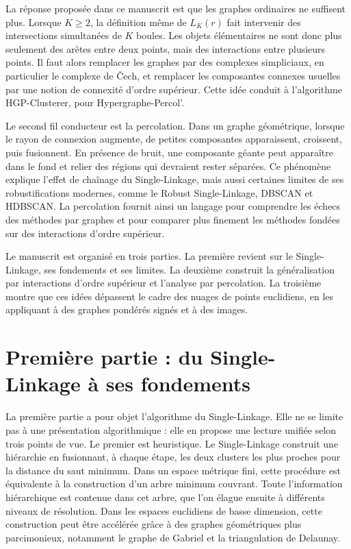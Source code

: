 La réponse proposée dans ce manuscrit est que les graphes ordinaires ne suffisent plus. Lorsque $K\geq 2$, la définition même de $L_K(r)$ fait intervenir des intersections simultanées de $K$ boules. Les objets élémentaires ne sont donc plus seulement des arêtes entre deux points, mais des interactions entre plusieurs points. Il faut alors remplacer les graphes par des complexes simpliciaux, en particulier le complexe de \v{C}ech, et remplacer les composantes connexes usuelles par une notion de connexité d'ordre supérieur. Cette idée conduit à l'algorithme HGP-Clusterer, pour Hypergraphe-Percol'.

Le second fil conducteur est la percolation. Dans un graphe géométrique, lorsque le rayon de connexion augmente, de petites composantes apparaissent, croissent, puis fusionnent. En présence de bruit, une composante géante peut apparaître dans le fond et relier des régions qui devraient rester séparées. Ce phénomène explique l'effet de chaînage du Single-Linkage, mais aussi certaines limites de ses robustifications modernes, comme le Robust Single-Linkage, DBSCAN et HDBSCAN. La percolation fournit ainsi un langage pour comprendre les échecs des méthodes par graphes et pour comparer plus finement les méthodes fondées sur des interactions d'ordre supérieur.

Le manuscrit est organisé en trois parties. La première revient sur le Single-Linkage, ses fondements et ses limites. La deuxième construit la généralisation par interactions d'ordre supérieur et l'analyse par percolation. La troisième montre que ces idées dépassent le cadre des nuages de points euclidiens, en les appliquant à des graphes pondérés signés et à des images.

\section*{Première partie : du Single-Linkage à ses fondements}

La première partie a pour objet l'algorithme du Single-Linkage. Elle ne se limite pas à une présentation algorithmique : elle en propose une lecture unifiée selon trois points de vue. Le premier est heuristique. Le Single-Linkage construit une hiérarchie en fusionnant, à chaque étape, les deux clusters les plus proches pour la distance du saut minimum. Dans un espace métrique fini, cette procédure est équivalente à la construction d'un arbre minimum couvrant. Toute l'information hiérarchique est contenue dans cet arbre, que l'on élague ensuite à différents niveaux de résolution. Dans les espaces euclidiens de basse dimension, cette construction peut être accélérée grâce à des graphes géométriques plus parcimonieux, notamment le graphe de Gabriel et la triangulation de Delaunay.

